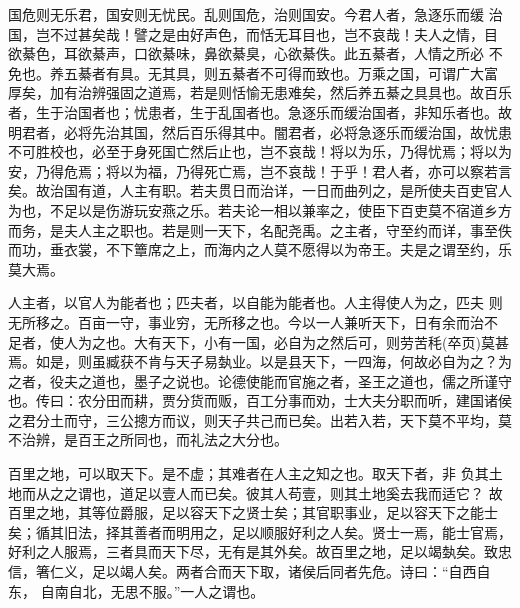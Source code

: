 \documentclass[]{article}
\begin{document}
国危则无乐君，国安则无忧民。乱则国危，治则国安。今君人者，急逐乐而缓
治国，岂不过甚矣哉！譬之是由好声色，而恬无耳目也，岂不哀哉！夫人之情，目
欲綦色，耳欲綦声，口欲綦味，鼻欲綦臭，心欲綦佚。此五綦者，人情之所必
不免也。养五綦者有具。无其具，则五綦者不可得而致也。万乘之国，可谓广大富
厚矣，加有治辨强固之道焉，若是则恬愉无患难矣，然后养五綦之具具也。故百乐
者，生于治国者也；忧患者，生于乱国者也。急逐乐而缓治国者，非知乐者也。故
明君者，必将先治其国，然后百乐得其中。闇君者，必将急逐乐而缓治国，故忧患
不可胜校也，必至于身死国亡然后止也，岂不哀哉！将以为乐，乃得忧焉；将以为
安，乃得危焉；将以为福，乃得死亡焉，岂不哀哉！于乎！君人者，亦可以察若言
矣。故治国有道，人主有职。若夫贯日而治详，一日而曲列之，是所使夫百吏官人
为也，不足以是伤游玩安燕之乐。若夫论一相以兼率之，使臣下百吏莫不宿道乡方
而务，是夫人主之职也。若是则一天下，名配尧禹。之主者，守至约而详，事至佚
而功，垂衣裳，不下簟席之上，而海内之人莫不愿得以为帝王。夫是之谓至约，乐
莫大焉。

人主者，以官人为能者也；匹夫者，以自能为能者也。人主得使人为之，匹夫
则无所移之。百亩一守，事业穷，无所移之也。今以一人兼听天下，日有余而治不
足者，使人为之也。大有天下，小有一国，必自为之然后可，则劳苦秏(卒页)莫甚
焉。如是，则虽臧获不肯与天子易埶业。以是县天下，一四海，何故必自为之？为
之者，役夫之道也，墨子之说也。论德使能而官施之者，圣王之道也，儒之所谨守
也。传曰：农分田而耕，贾分货而贩，百工分事而劝，士大夫分职而听，建国诸侯
之君分土而守，三公摠方而议，则天子共己而已矣。出若入若，天下莫不平均，莫
不治辨，是百王之所同也，而礼法之大分也。

百里之地，可以取天下。是不虚；其难者在人主之知之也。取天下者，非
负其土地而从之之谓也，道足以壹人而已矣。彼其人苟壹，则其土地奚去我而适它？
故百里之地，其等位爵服，足以容天下之贤士矣；其官职事业，足以容天下之能士
矣；循其旧法，择其善者而明用之，足以顺服好利之人矣。贤士一焉，能士官焉，
好利之人服焉，三者具而天下尽，无有是其外矣。故百里之地，足以竭埶矣。致忠
信，箸仁义，足以竭人矣。两者合而天下取，诸侯后同者先危。诗曰：``自西自东，
自南自北，无思不服。''一人之谓也。
\end{document}
